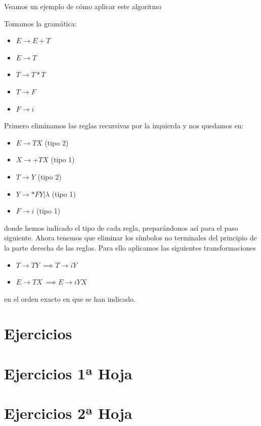 \documentclass{apuntes}
\begin{document}
Veamos un ejemplo de cómo aplicar este algoritmo
\begin{example}
Tomamos la gramática:
\begin{itemize}
\item $E \rightarrow E+T$
\item $E \rightarrow T$
\item $T \rightarrow T*T$
\item $T \rightarrow F$
\item $F \rightarrow i$
\end{itemize}
Primero eliminamos las reglas recursivas por la izquierda y nos quedamos en:
\begin{itemize}
\item $E \rightarrow TX$ (tipo 2)
\item $X \rightarrow +TX$ (tipo 1)
\item $T \rightarrow Y$ (tipo 2)
\item $Y \rightarrow *FY|λ$ (tipo 1)
\item $F \rightarrow i$ (tipo 1)
\end{itemize}
donde hemos indicado el tipo de cada regla, preparándonos así para el paso siguiente.
Ahora tenemos que eliminar los símbolos no terminales del principio de la parte derecha de las reglas. Para ello aplicamos las siguientes transformaciones
\begin{itemize}
\item $T \rightarrow TY \ \implies T \rightarrow iY$
\item $E \rightarrow TX \ \implies E \rightarrow iYX$
\end{itemize}
en el orden exacto en que se han indicado.
\end{example}

\appendix
\chapter{Ejercicios}


\chapter{Ejercicios 1ª Hoja}


\chapter{Ejercicios 2ª Hoja}


\printindex
\end{document}
